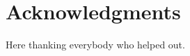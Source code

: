 \documentclass{sigchi}
\begin{document}
\section{Acknowledgments}

Here thanking everybody who helped out.

%
%
%
%
%
\balance{}



\end{document}
